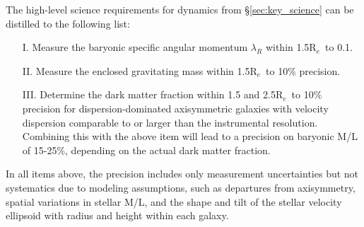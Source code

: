 \documentclass[preprint,11pt]{aastex}
\newcommand{\Reff}{{R$_{e}$}}
\begin{document}


The high-level science requirements for dynamics from
\S\ref{sec:key_science} can be distilled to the following list:

\begin{itemize}


\item[I.] Measure the baryonic specific angular momentum $\lambda_R$ within 1.5\Reff\ to 0.1.

\item[II.] Measure the enclosed gravitating mass within 1.5\Reff\ to 10\% precision. 

\item[III.] Determine the dark matter fraction within 1.5 and 2.5\Reff\ to
  10\% precision for dispersion-dominated axisymmetric galaxies with
  velocity dispersion comparable to or larger than the instrumental
  resolution. Combining this with the above item will lead to a
  precision on baryonic M/L of 15-25\%, depending on the actual dark
  matter fraction.

\end{itemize}

\medskip
\noindent In all items above, the precision includes only measurement
uncertainties but not systematics due to modeling assumptions, such as
departures from axisymmetry, spatial variations in stellar M/L, and
the shape and tilt of the stellar velocity ellipsoid with radius and
height within each galaxy.

\end{document}
